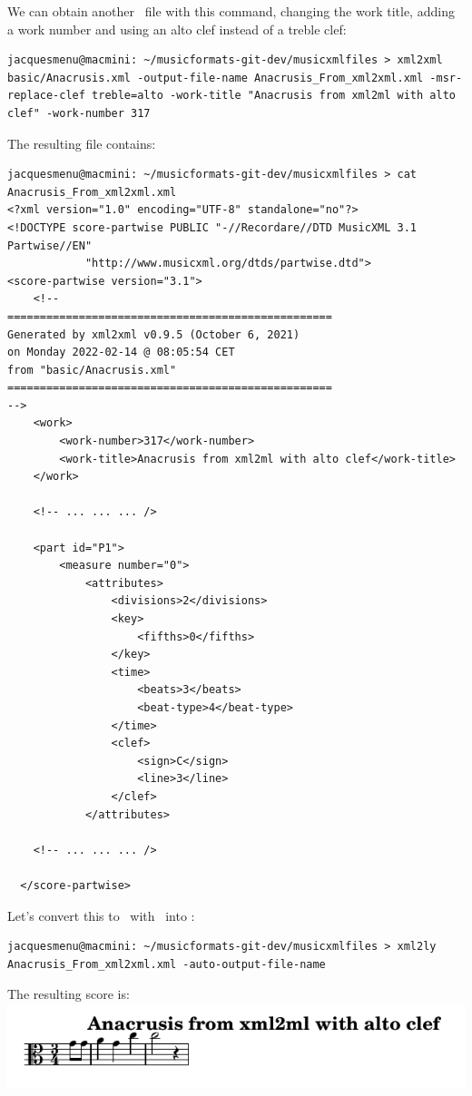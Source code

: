 We can obtain another \mxml\ file with this command, changing the work title, adding a work number and using an alto clef instead of a treble clef:
\begin{lstlisting}[language=Terminal]
jacquesmenu@macmini: ~/musicformats-git-dev/musicxmlfiles > xml2xml basic/Anacrusis.xml -output-file-name Anacrusis_From_xml2xml.xml -msr-replace-clef treble=alto -work-title "Anacrusis from xml2ml with alto clef" -work-number 317
\end{lstlisting}

The resulting file  contains:
\begin{lstlisting}[language=MusicXML]
jacquesmenu@macmini: ~/musicformats-git-dev/musicxmlfiles > cat Anacrusis_From_xml2xml.xml
<?xml version="1.0" encoding="UTF-8" standalone="no"?>
<!DOCTYPE score-partwise PUBLIC "-//Recordare//DTD MusicXML 3.1 Partwise//EN"
			"http://www.musicxml.org/dtds/partwise.dtd">
<score-partwise version="3.1">
    <!--
==================================================
Generated by xml2xml v0.9.5 (October 6, 2021)
on Monday 2022-02-14 @ 08:05:54 CET
from "basic/Anacrusis.xml"
==================================================
-->
    <work>
        <work-number>317</work-number>
        <work-title>Anacrusis from xml2ml with alto clef</work-title>
    </work>

	<!-- ... ... ... />

    <part id="P1">
        <measure number="0">
            <attributes>
                <divisions>2</divisions>
                <key>
                    <fifths>0</fifths>
                </key>
                <time>
                    <beats>3</beats>
                    <beat-type>4</beat-type>
                </time>
                <clef>
                    <sign>C</sign>
                    <line>3</line>
                </clef>
            </attributes>

	<!-- ... ... ... />

  </score-partwise>
\end{lstlisting}

Let's convert this to \lily\ with \xmlToLy\ into :
\begin{lstlisting}[language=Terminal]
jacquesmenu@macmini: ~/musicformats-git-dev/musicxmlfiles > xml2ly Anacrusis_From_xml2xml.xml -auto-output-file-name
\end{lstlisting}

The resulting score is:\\
\includegraphics[scale=0.7]{../mfgraphics/mfgraphicsAnacrusis_From_xml2xml.png}

